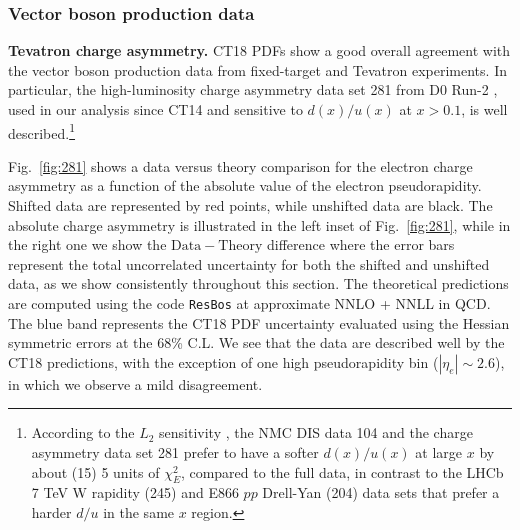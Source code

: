 \subsubsection{Vector boson production data}
\label{sec:QualityDYdata}
%
{\bf Tevatron charge asymmetry.}
%
CT18 PDFs show a good overall agreement with the vector boson production data from fixed-target and Tevatron experiments. In particular, the high-luminosity charge asymmetry data set 281 from D0 Run-2 \cite{D0:2014kma}, used in our analysis since CT14 \cite{Dulat:2015mca} and sensitive to $d(x)/u(x)$ at $x>0.1$, is well described.\footnote{According to the $L_2$ sensitivity \cite{CT18L2Sensitivity}, the NMC DIS data 104 and the charge asymmetry data set 281 prefer to have a softer $d(x)/u(x)$ at large $x$ by about (15) 5 units of $\chi^2_E$, compared to the full data, in contrast to the LHCb 7 TeV W rapidity (245) and E866 $pp$ Drell-Yan (204) data sets that prefer a harder $d/u$ in the same $x$ region.}

%
Fig.~\ref{fig:281} shows a data versus theory comparison for the electron charge asymmetry as a function of the absolute value of the electron pseudorapidity.
Shifted data are represented by red points, while unshifted data are black. 
The absolute charge asymmetry is illustrated in the left inset of Fig.~\ref{fig:281}, while in the right one we show the 
$\mathrm{Data}\!-\!\mathrm{Theory}$ difference where the error bars represent the total uncorrelated uncertainty for both the shifted and unshifted data, as we show consistently
throughout this section.
The theoretical predictions are computed using the code \texttt{ResBos} at approximate NNLO + NNLL in QCD. 
The blue band represents the CT18 PDF uncertainty evaluated using the Hessian symmetric errors at 
the 68\% C.L. We see that the data are described well by the CT18 predictions, with the 
exception of one high pseudorapidity bin ($|\eta_{e}|\sim2.6$), in which we observe a mild disagreement. 


